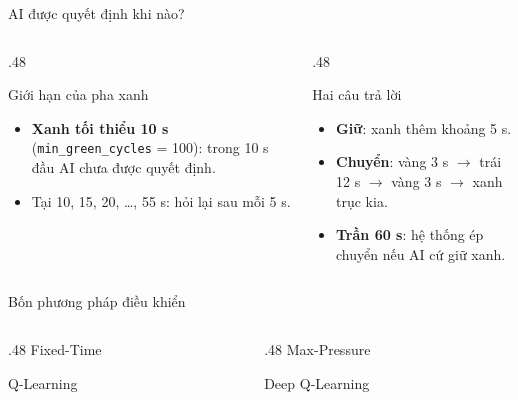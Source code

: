\documentclass[aspectratio=169,10pt]{beamer}
\begin{document}
  \begin{frame}{AI được quyết định khi nào?}
    \relax
    \begin{columns}[T,onlytextwidth]
      \begin{column}{.48\textwidth}
        \begin{block}{Giới hạn của pha xanh}
          \begin{itemize}
            \item \textbf{Xanh tối thiểu 10 s} (\texttt{min\_green\_cycles} = 100): trong 10 s đầu AI chưa được quyết định.
            \item Tại 10, 15, 20, …, 55 s: hỏi lại sau mỗi 5 s.
          \end{itemize}
        \end{block}
      \end{column}
      \begin{column}{.48\textwidth}
        \begin{block}{Hai câu trả lời}
          \begin{itemize}
            \item \textbf{Giữ}: xanh thêm khoảng 5 s.
            \item \textbf{Chuyển}: vàng 3 s $\rightarrow$ trái 12 s $\rightarrow$ vàng 3 s $\rightarrow$ xanh trục kia.
            \item \textbf{Trần 60 s}: hệ thống ép chuyển nếu AI cứ giữ xanh.
          \end{itemize}
        \end{block}
      \end{column}
    \end{columns}
    \vspace{.3cm}
  \end{frame}
  \begin{frame}{Bốn phương pháp điều khiển}
    \relax
    \vspace{1cm}
    \begin{columns}[T,onlytextwidth]
      \begin{column}{.48\textwidth}
        \centering\Large Fixed-Time\par\vspace{1cm}Q-Learning
      \end{column}
      \begin{column}{.48\textwidth}
        \centering\Large Max-Pressure\par\vspace{1cm}Deep Q-Learning
      \end{column}
    \end{columns}
  \end{frame}
\end{document}
